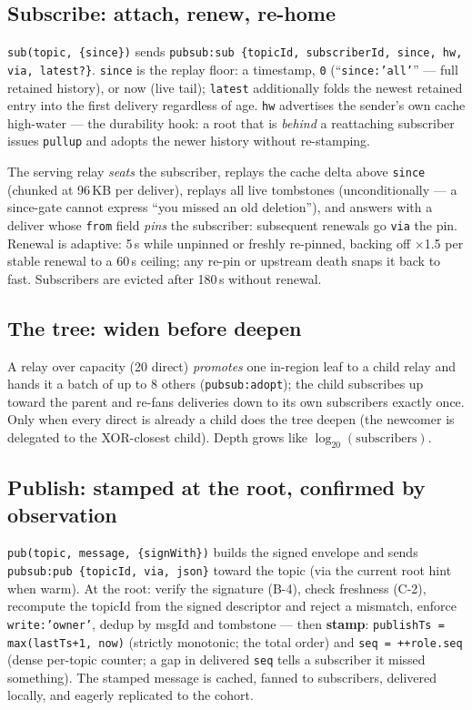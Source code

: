 \documentclass[nobib]{tufte-handout}
\begin{document}
\subsection{Subscribe: attach, renew, re-home}

\texttt{sub(topic, \{since\})} sends
\texttt{pubsub:sub \{topicId, subscriberId, since, hw, via, latest?\}}.
\texttt{since} is the replay floor: a timestamp, \texttt{0}
(``\texttt{since:'all'}'' --- full retained history), or now (live
tail); \texttt{latest} additionally folds the newest retained entry into
the first delivery regardless of age. \texttt{hw} advertises the
sender's own cache high-water --- the durability hook: a root that is
\emph{behind} a reattaching subscriber issues \texttt{pullup} and adopts
the newer history without re-stamping.

The serving relay \emph{seats} the subscriber, replays the cache delta
above \texttt{since} (chunked at 96\,KB per deliver), replays all live
tombstones (unconditionally --- a since-gate cannot express ``you missed
an old deletion''), and answers with a deliver whose \texttt{from} field
\emph{pins} the subscriber: subsequent renewals go \texttt{via} the pin.
Renewal is adaptive: 5\,s while unpinned or freshly re-pinned, backing
off $\times$1.5 per stable renewal to a 60\,s ceiling; any re-pin or
upstream death snaps it back to fast. Subscribers are evicted after
180\,s without renewal.

\subsection{The tree: widen before deepen}

A relay over capacity (20 direct) \emph{promotes} one in-region leaf to
a child relay and hands it a batch of up to 8 others
(\texttt{pubsub:adopt}); the child subscribes up toward the parent and
re-fans deliveries down to its own subscribers exactly once. Only when
every direct is already a child does the tree deepen (the newcomer is
delegated to the XOR-closest child). Depth grows like
$\log_{20}(\mathrm{subscribers})$.

\subsection{Publish: stamped at the root, confirmed by observation}

\texttt{pub(topic, message, \{signWith\})} builds the signed envelope
and sends \texttt{pubsub:pub \{topicId, via, json\}} toward the topic
(via the current root hint when warm). At the root: verify the
signature (B-4), check freshness (C-2), recompute the topicId from the
signed descriptor and reject a mismatch, enforce \texttt{write:'owner'},
dedup by msgId and tombstone --- then \textbf{stamp}:
\texttt{publishTs = max(lastTs+1, now)} (strictly monotonic; the total
order) and \texttt{seq = ++role.seq} (dense per-topic counter; a gap in
delivered \texttt{seq} tells a subscriber it missed something). The
stamped message is cached, fanned to subscribers, delivered locally,
and eagerly replicated to the cohort.
\end{document}
